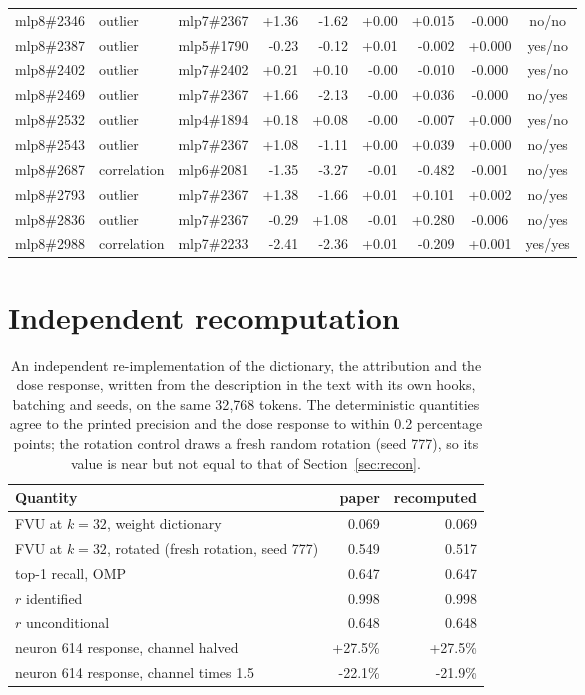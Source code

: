 \begin{center}
\begin{longtable}{llrrrrrcc}
mlp8\#2346 & outlier & mlp7\#2367 & +1.36 & -1.62 & +0.00 & +0.015 & -0.000 & no/no \\
mlp8\#2387 & outlier & mlp5\#1790 & -0.23 & -0.12 & +0.01 & -0.002 & +0.000 & yes/no \\
mlp8\#2402 & outlier & mlp7\#2402 & +0.21 & +0.10 & -0.00 & -0.010 & -0.000 & yes/no \\
mlp8\#2469 & outlier & mlp7\#2367 & +1.66 & -2.13 & -0.00 & +0.036 & -0.000 & no/yes \\
mlp8\#2532 & outlier & mlp4\#1894 & +0.18 & +0.08 & -0.00 & -0.007 & +0.000 & yes/no \\
mlp8\#2543 & outlier & mlp7\#2367 & +1.08 & -1.11 & +0.00 & +0.039 & +0.000 & no/yes \\
mlp8\#2687 & correlation & mlp6\#2081 & -1.35 & -3.27 & -0.01 & -0.482 & -0.001 & no/yes \\
mlp8\#2793 & outlier & mlp7\#2367 & +1.38 & -1.66 & +0.01 & +0.101 & +0.002 & no/yes \\
mlp8\#2836 & outlier & mlp7\#2367 & -0.29 & +1.08 & -0.01 & +0.280 & -0.006 & no/yes \\
mlp8\#2988 & correlation & mlp7\#2233 & -2.41 & -2.36 & +0.01 & -0.209 & +0.001 & yes/yes \\
\end{longtable}\end{center}
\section{Independent recomputation}\label{app:audit}
\begin{table}[H]\centering\small
\caption{An independent re-implementation of the dictionary, the attribution and the dose response, written from the description in the text with its own hooks, batching and seeds, on the same 32{,}768 tokens. The deterministic quantities agree to the printed precision and the dose response to within 0.2 percentage points; the rotation control draws a fresh random rotation (seed 777), so its value is near but not equal to that of Section~\ref{sec:recon}.}\label{app:audit-table}
\begin{adjustbox}{max width=\linewidth}
\begin{tabular}{lrr}\toprule
Quantity & paper & recomputed \\ \midrule
FVU at $k=32$, weight dictionary & 0.069 & 0.069 \\
FVU at $k=32$, rotated (fresh rotation, seed 777) & 0.549 & 0.517 \\
top-1 recall, OMP & 0.647 & 0.647 \\
$r$ identified & 0.998 & 0.998 \\
$r$ unconditional & 0.648 & 0.648 \\
neuron 614 response, channel halved & +27.5\% & +27.5\% \\
neuron 614 response, channel times 1.5 & -22.1\% & -21.9\% \\
\bottomrule\end{tabular}\end{adjustbox}
\end{table}
